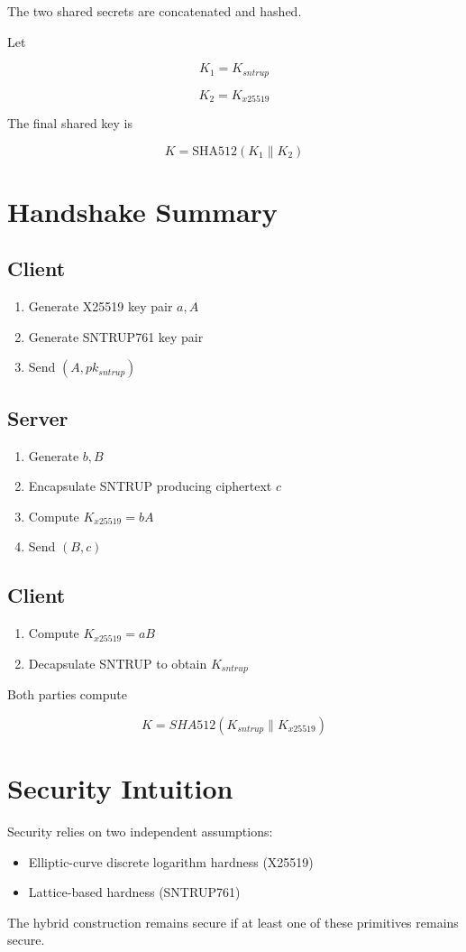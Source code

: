 \documentclass{article}
\begin{document}
The two shared secrets are concatenated and hashed.

Let

\[
K_1 = K_{sntrup}
\]

\[
K_2 = K_{x25519}
\]

The final shared key is

\[
K = \text{SHA512}(K_1 \parallel K_2)
\]

\section{Handshake Summary}

\subsection{Client}

\begin{enumerate}
\item Generate X25519 key pair \(a, A\)
\item Generate SNTRUP761 key pair
\item Send \( (A, pk_{sntrup}) \)
\end{enumerate}

\subsection{Server}

\begin{enumerate}
\item Generate \(b, B\)
\item Encapsulate SNTRUP producing ciphertext \(c\)
\item Compute \(K_{x25519} = bA\)
\item Send \( (B, c) \)
\end{enumerate}

\subsection{Client}

\begin{enumerate}
\item Compute \(K_{x25519} = aB\)
\item Decapsulate SNTRUP to obtain \(K_{sntrup}\)
\end{enumerate}

Both parties compute

\[
K = SHA512(K_{sntrup} \parallel K_{x25519})
\]

\section{Security Intuition}

Security relies on two independent assumptions:

\begin{itemize}
\item Elliptic-curve discrete logarithm hardness (X25519)
\item Lattice-based hardness (SNTRUP761)
\end{itemize}

The hybrid construction remains secure if at least one of these primitives remains secure.
\end{document}
